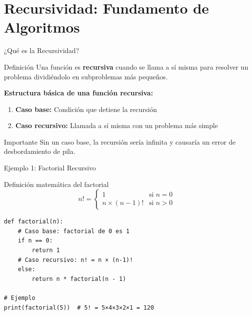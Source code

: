 \documentclass[10pt]{beamer}
\begin{document}
\section{Recursividad: Fundamento de Algoritmos}

\begin{frame}{¿Qué es la Recursividad?}
  \begin{block}{Definición}
    Una función es \textbf{recursiva} cuando se llama a sí misma para resolver 
    un problema dividiéndolo en subproblemas más pequeños.
  \end{block}
  
  \vspace{0.3cm}
  \textbf{Estructura básica de una función recursiva:}
  \begin{enumerate}
    \item \textbf{Caso base:} Condición que detiene la recursión
    \item \textbf{Caso recursivo:} Llamada a sí misma con un problema más simple
  \end{enumerate}
  
  \vspace{0.3cm}
  \begin{alertblock}{Importante}
    Sin un caso base, la recursión sería infinita y causaría un error de desbordamiento de pila.
  \end{alertblock}
\end{frame}

\begin{frame}[fragile]{Ejemplo 1: Factorial Recursivo}
  \begin{block}{Definición matemática del factorial}
    \[
    n! = \begin{cases}
      1 & \text{si } n = 0 \\
      n \times (n-1)! & \text{si } n > 0
    \end{cases}
    \]
  \end{block}
  
\begin{verbatim}
def factorial(n):
    # Caso base: factorial de 0 es 1
    if n == 0:
        return 1
    # Caso recursivo: n! = n × (n-1)!
    else:
        return n * factorial(n - 1)

# Ejemplo
print(factorial(5))  # 5! = 5×4×3×2×1 = 120
\end{verbatim}
\end{frame}
\end{document}
